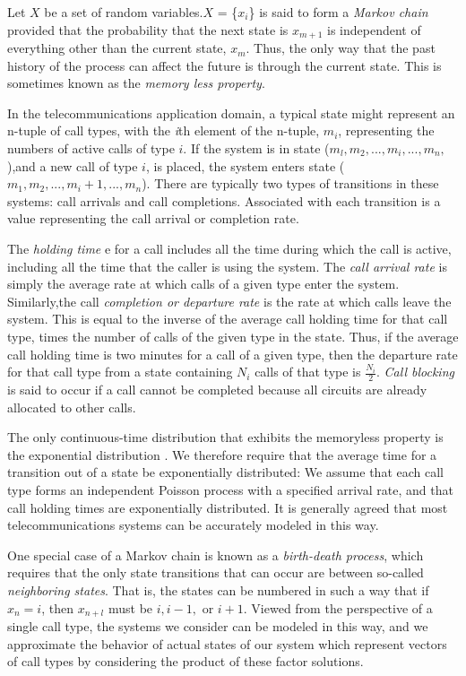 \documentclass[journal, twoside]{IEEEtran}
\begin{document}
Let \(X\) be a set of random variables.\(X\) = \{\(x_i\)\}  is said to form a \textit{Markov chain}  provided that the probability that the next state
is \(x_{m+1}\) is independent of everything other than the current
state, \(x_m\). Thus, the only way that the past history of the process
can affect the future is through the current state. This is sometimes known as the \textit{memory less property}.

In the telecommunications application domain, a typical
state might represent an n-tuple of call types, with the \textit{i}th element of the n-tuple, \(m_i\),  representing the numbers of active
calls of type \(i\). If the system is in state (\(m_l, m_2, ..., m_i, ..., m_n,\)),and a new call of type \(i\), is placed, the system enters state (\(m_1, m_2, ...,m_i+1, ..., m_n\)). There are typically two types of transitions in these systems: call arrivals and call completions. Associated with each transition is a value representing the call
arrival or completion rate.

The \textit{holding time} e for a call includes all the time during
which the call is active, including all the time that the caller is
using the system. The \textit{call arrival rate }is simply the average rate at which calls of a given type enter the system. Similarly,the call \textit{completion or departure rate} is the rate at which calls leave the system. This is equal to the inverse of the average
call holding time for that call type, times the number of calls of the given type in the state. Thus, if the average call holding time is two minutes for a call of a given type, then the departure rate for that call type from a state containing \(N_i\) calls of
that type is \(\frac{N_i}{2}\). \textit{Call blocking} is said to occur if a call cannot be completed because all circuits are already allocated to other calls.

The only continuous-time distribution that exhibits the
memoryless property is the exponential distribution \cite{b5}. We
therefore require that the average time for a transition out of a state be exponentially distributed: We assume that each call type forms an independent Poisson process with a specified arrival rate, and that call holding times are exponentially distributed. It is generally agreed that most telecommunications systems can be accurately modeled in this way.

One special case of a Markov chain is known as a \textit{birth-death process}, which requires that the only state transitions
that can occur are between so-called \textit{neighboring states}. That
is, the states can be numbered in such a way that if \(x_n = i\), then \(x_{n+l}\) must be \(i, i - 1,\) or \(i + 1.\) Viewed from the perspective of a single call type, the systems we consider can be modeled in this way, and we approximate the behavior of actual states of our system which represent vectors of call types by considering the product of these factor solutions.
\end{document}
